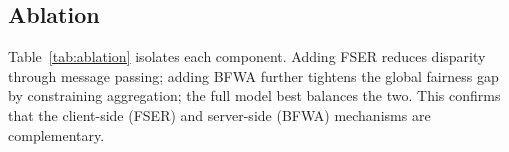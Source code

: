 \begin{table}[t]\centering\small
\caption{Demographic Parity Difference (DPD, lower is fairer).}
\label{tab:main-dpd}

\end{table}

\begin{table}[t]\centering\small
\caption{Equal Opportunity Difference (EOD, lower is fairer).}
\label{tab:main-eod}

\end{table}

\subsection{Ablation}
\label{sec:exp-ablation}
Table~\ref{tab:ablation} isolates each component. Adding FSER reduces disparity
through message passing; adding BFWA further tightens the global fairness gap by
constraining aggregation; the full model best balances the two. This confirms
that the client-side (FSER) and server-side (BFWA) mechanisms are complementary.

\begin{table}[t]\centering\small
\caption{Ablation of TrustFedGNN components (no DP). AUC / DPD per dataset.}
\label{tab:ablation}

\end{table}


